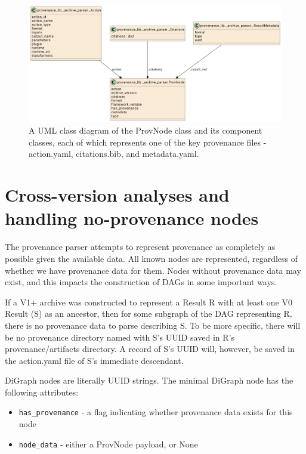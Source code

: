 \begin{figure}[htp]
\centering
\includegraphics[width=\textwidth]{figures/ProvNode_UML.png}
\caption[UML Class diagram of the ProvNode class and its components]%
{A UML class diagram of the ProvNode class and its component classes, each of
which represents one of the key provenance files - action.yaml, citations.bib,
and metadata.yaml.}
\label{fig:ProvNode_UML}
\end{figure}

\section{Cross-version analyses and handling no-provenance nodes}

The provenance parser attempts to represent provenance as completely as possible
given the available data. All known nodes are represented, regardless of whether
we have provenance data for them. Nodes without provenance data may exist, and
this impacts the construction of DAGs in some important ways.

If a V1+ archive was constructed to represent a Result R with at least one V0
Result (S) as an ancestor, then for some subgraph of the DAG representing R,
there is no provenance data to parse describing S. To be more specific, there
will be no provenance directory named with S’s UUID saved in R’s
provenance/artifacts directory. A record of S’s UUID will, however, be saved in
the action.yaml file of S’s immediate descendant.

DiGraph nodes are literally UUID strings. The minimal DiGraph node has the
following attributes:
\begin{itemize}
    \item \texttt{has\_provenance} - a flag indicating whether provenance data exists for this node
    \item \texttt{node\_data} - either a ProvNode payload, or None
\end{itemize}

